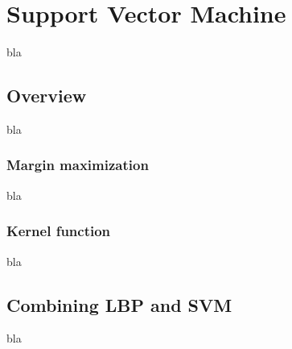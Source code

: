 \chapter{Support Vector Machine}
\label{chap:svm}

\noindent bla
\newline

\section{Overview}

\noindent bla
\newline

\subsection{Margin maximization}

\vspace{\baselineskip}
\noindent bla
\newline

\subsection{Kernel function}

\vspace{\baselineskip}
\noindent bla
\newline

\section{Combining LBP and SVM}

\noindent bla
\newline

